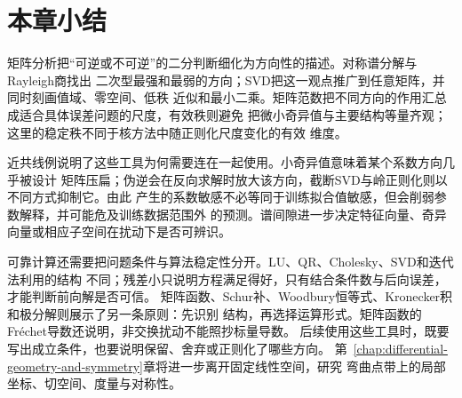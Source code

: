 \section{本章小结}
\label{sec:matrix-analysis-summary}

矩阵分析把“可逆或不可逆”的二分判断细化为方向性的描述。对称谱分解与Rayleigh商找出
二次型最强和最弱的方向；SVD把这一观点推广到任意矩阵，并同时刻画值域、零空间、低秩
近似和最小二乘。矩阵范数把不同方向的作用汇总成适合具体误差问题的尺度，有效秩则避免
把微小奇异值与主要结构等量齐观；这里的稳定秩不同于核方法中随正则化尺度变化的有效
维度。

近共线例说明了这些工具为何需要连在一起使用。小奇异值意味着某个系数方向几乎被设计
矩阵压扁；伪逆会在反向求解时放大该方向，截断SVD与岭正则化则以不同方式抑制它。由此
产生的系数敏感不必等同于训练拟合值敏感，但会削弱参数解释，并可能危及训练数据范围外
的预测。谱间隙进一步决定特征向量、奇异向量或相应子空间在扰动下是否可辨识。

可靠计算还需要把问题条件与算法稳定性分开。LU、QR、Cholesky、SVD和迭代法利用的结构
不同；残差小只说明方程满足得好，只有结合条件数与后向误差，才能判断前向解是否可信。
矩阵函数、Schur补、Woodbury恒等式、Kronecker积和极分解则展示了另一条原则：先识别
结构，再选择运算形式。矩阵函数的Fréchet导数还说明，非交换扰动不能照抄标量导数。
后续使用这些工具时，既要写出成立条件，也要说明保留、舍弃或正则化了哪些方向。
第~\ref{chap:differential-geometry-and-symmetry}章将进一步离开固定线性空间，研究
弯曲点带上的局部坐标、切空间、度量与对称性。
